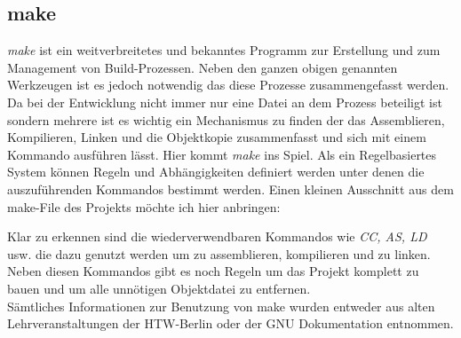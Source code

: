 \subsection{make}
\textit{make} ist ein weitverbreitetes und bekanntes Programm zur Erstellung und zum Management von Build-Prozessen. Neben den ganzen obigen genannten Werkzeugen ist es jedoch notwendig das diese Prozesse zusammengefasst werden. Da bei der Entwicklung nicht immer nur eine Datei an dem Prozess beteiligt ist sondern mehrere ist es wichtig ein Mechanismus zu finden der das Assemblieren, Kompilieren, Linken und die Objektkopie zusammenfasst und sich mit einem Kommando ausf\"uhren l\"asst. Hier kommt \textit{make} ins Spiel. Als ein Regelbasiertes System k\"onnen Regeln und Abh\"angigkeiten definiert werden unter denen die auszuf\"uhrenden Kommandos bestimmt werden. Einen kleinen Ausschnitt aus dem make-File des Projekts m\"ochte ich hier anbringen:

Klar zu erkennen sind die wiederverwendbaren Kommandos wie \textit{CC, AS, LD} usw. die dazu genutzt werden um zu assemblieren, kompilieren und zu linken. Neben diesen Kommandos gibt es noch Regeln um das Projekt komplett zu bauen und um alle unn\"otigen Objektdatei zu entfernen.\\
S\"amtliches Informationen zur Benutzung von make wurden entweder aus alten Lehrveranstaltungen der HTW-Berlin oder der GNU Dokumentation \parencite{make} entnommen.

 